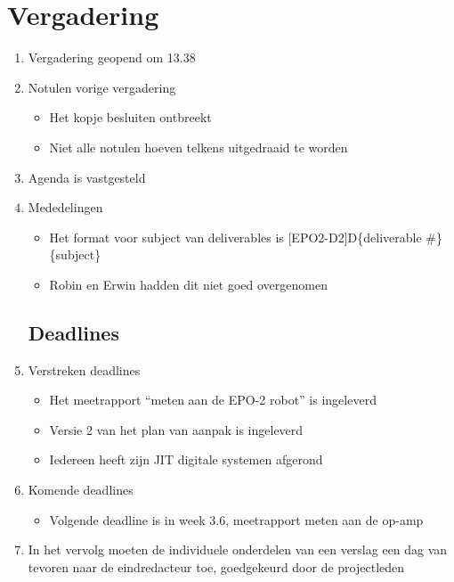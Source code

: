 \documentclass{article}
\begin{document}
\section*{Vergadering}
\begin{enumerate}
	
	\subsection*{Vooraf}
	\item Vergadering geopend om 13.38
	\item Notulen vorige vergadering
	\begin{itemize}
		\item Het kopje besluiten ontbreekt
		\item Niet alle notulen hoeven telkens uitgedraaid te worden
	\end{itemize}
	\item Agenda is vastgesteld
	\item Mededelingen
	\begin{itemize}
		\item Het format voor subject van deliverables is [EPO2-D2]D\{deliverable \#\} \{subject\}
		\item Robin en Erwin hadden dit niet goed overgenomen
	\end{itemize}

	\subsection*{Deadlines}
	\item Verstreken deadlines
	\begin{itemize}
		\item Het meetrapport ``meten aan de EPO-2 robot'' is ingeleverd
		\item Versie 2 van het plan van aanpak is ingeleverd
		\item Iedereen heeft zijn JIT digitale systemen afgerond
	\end{itemize}
	\item Komende deadlines
	\begin{itemize}
		\item Volgende deadline is in week 3.6, meetrapport meten aan de op-amp
	\end{itemize}
	\item In het vervolg moeten de individuele onderdelen van een verslag een dag van tevoren naar de eindredacteur toe, goedgekeurd door de projectleden


\end{enumerate}
\end{document}
